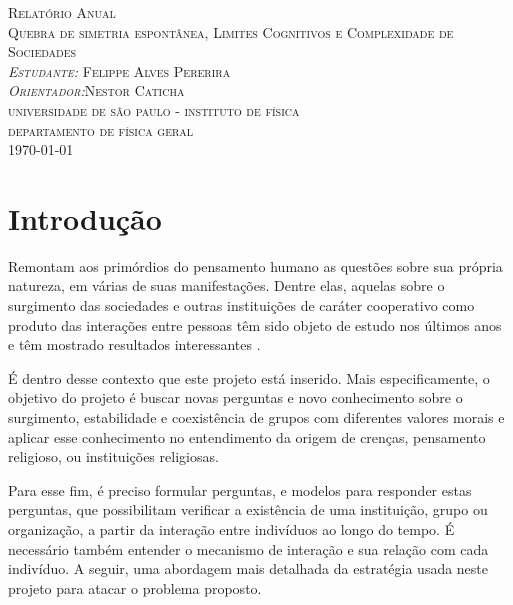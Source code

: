 \documentclass[11pt]{article}
\begin{document}
\begin{titlepage}
\begin{center}
\textsc{\Large Relatório Anual \\}
\textsc{\Huge Quebra de simetria espontânea,
              Limites Cognitivos e Complexidade
              de Sociedades}\\[0.5cm]
\vfill
\textsc{\small {\it Estudante:} \/Felippe Alves Pererira\\ 
               {\it Orientador:}\/Nestor Caticha\\
       }
\textsc{universidade de são paulo - instituto de física}\\
\textsc{\small departamento de física geral}\\
\small \today
\end{center}
\end{titlepage}

\newpage


\newpage\null\thispagestyle{empty}\newpage
\section{Introdução}

Remontam aos primórdios do pensamento humano as questões sobre sua própria
natureza, em várias de suas manifestações. Dentre elas, aquelas sobre
o surgimento das sociedades e outras instituições de caráter cooperativo como
produto das interações entre pessoas têm sido objeto de estudo
nos últimos anos e têm mostrado resultados interessantes
\cite{CatichaetalA,Schonmannetal2011a,Perreault,Jonatas,visujeca}.

É dentro desse contexto que este projeto está inserido. Mais especificamente, o
objetivo do projeto é buscar novas perguntas e novo conhecimento sobre o
surgimento, estabilidade e coexistência de grupos com diferentes valores morais
e aplicar esse conhecimento no entendimento
da origem de crenças, pensamento religioso, ou instituições religiosas.

Para esse fim, é preciso formular perguntas, e modelos para responder estas
perguntas, que possibilitam verificar a existência de uma
instituição, grupo ou organização, a partir da interação entre indivíduos ao
longo do tempo. É necessário também entender o mecanismo de interação e
sua relação com cada indivíduo. A seguir, uma abordagem mais detalhada da
estratégia usada neste projeto para atacar o problema proposto.
\end{document}
